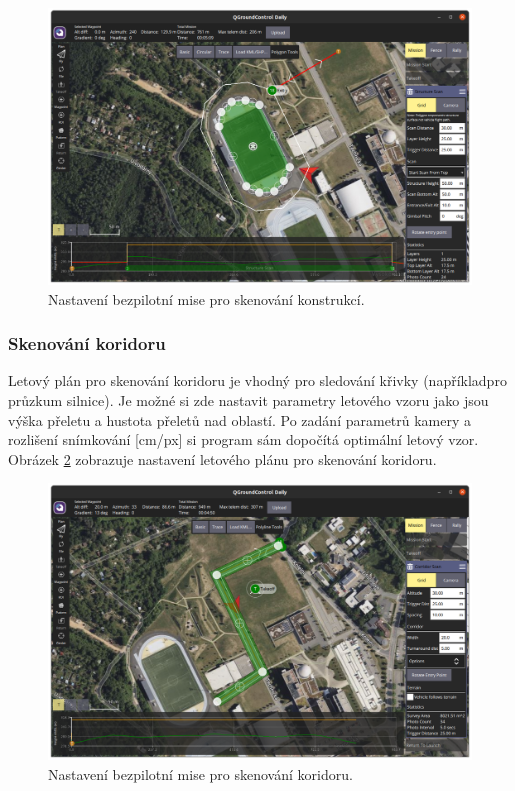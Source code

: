 \begin{figure}[!ht]
    \begin{center}
        \includegraphics[scale=0.34]{obrazky/QGC5}
    \end{center}
    \caption[Nastavení bezpilotní mise pro skenování konstrukcí]{Nastavení bezpilotní mise pro skenování konstrukcí.}
    \label{fig:QGC3}
\end{figure}

\subsubsection{Skenování koridoru}

Letový plán pro skenování koridoru je vhodný pro sledování křivky (například\break pro průzkum silnice). Je možné si zde nastavit parametry letového vzoru jako jsou výška přeletu a hustota přeletů nad oblastí. Po zadání parametrů kamery a rozlišení snímkování [cm/px] si program sám dopočítá optimální letový vzor. Obrázek \ref{fig:QGC4} zobrazuje nastavení letového plánu pro skenování koridoru.

\begin{figure}[!ht]
    \begin{center}
        \includegraphics[scale=0.34]{obrazky/QGC4}
    \end{center}
    \caption[Nastavení bezpilotní mise pro skenování koridoru]{Nastavení bezpilotní mise pro skenování koridoru.}
    \label{fig:QGC4}
\end{figure}

